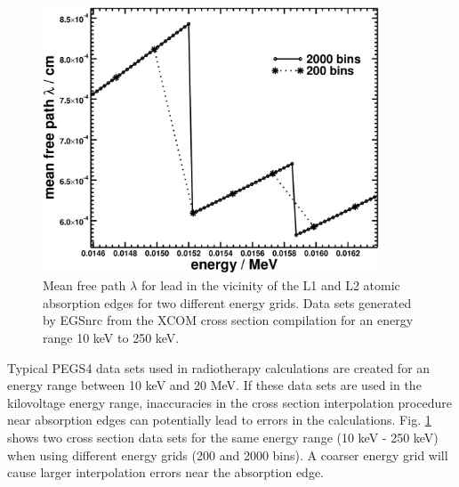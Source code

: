 \begin{figure}[hbtp]
\begin{center}
\includegraphics*[width=10.0cm]{figures/xcom_250keV_zoom}
\end{center}
\caption[Mean free path $\lambda$ for lead in the vicinity
of the L1 and L2 atomic absorption edges for two different
energy grids]
{Mean free path $\lambda$ for lead in the vicinity
of the L1 and L2 atomic absorption edges for two different
energy grids. Data sets generated by EGSnrc from
the XCOM cross section compilation for an energy range
10 keV to 250 keV.
}
\label{accuracy_xsections}
\end{figure}

Typical PEGS4 data sets used in radiotherapy
calculations are created for an energy range between 10 keV and 20 MeV.
If these data sets are used in the kilovoltage energy
range, inaccuracies in the cross section interpolation procedure near
absorption edges can potentially lead to errors in the calculations.
Fig. \ref{accuracy_xsections} shows two cross section data sets
for the same energy range (10 keV - 250 keV) when using
different energy grids (200 and 2000 bins). A coarser energy
grid will cause larger interpolation errors near the absorption edge.

